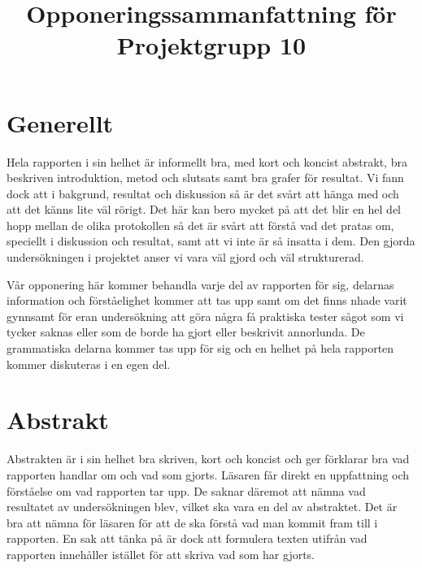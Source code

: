 \documentclass{article}
\begin{document}
\title{Opponeringssammanfattning för Projektgrupp 10}

\maketitle

\section{Generellt}
Hela rapporten i sin helhet är informellt bra, med kort och koncist abstrakt, bra beskriven introduktion, metod och slutsats samt bra grafer för resultat. Vi fann dock att i bakgrund, resultat och diskussion så är det svårt att hänga med och att det känns lite väl rörigt. Det här kan bero mycket på att det blir en hel del hopp mellan de olika protokollen så det är svårt att förstå vad det pratas om, speciellt i diskussion och resultat, samt att vi inte är så insatta i dem. Den gjorda undersökningen i projektet anser vi vara väl gjord och väl strukturerad.

Vår opponering här kommer behandla varje del av rapporten för sig, delarnas information och förståelighet kommer att tas upp samt om det finns nhade varit gynnsamt för eran undersökning att göra några få praktiska tester sågot som vi tycker saknas eller som de borde ha gjort eller beskrivit annorlunda. De grammatiska delarna kommer tas upp för sig och en helhet på hela rapporten kommer diskuteras i en egen del.

\section{Abstrakt}
Abstrakten är i sin helhet bra skriven, kort och koncist och ger förklarar bra vad rapporten handlar om och vad som gjorts. Läsaren får direkt en uppfattning och förståelse om vad rapporten tar upp. De saknar däremot att nämna vad resultatet av undersökningen blev, vilket ska vara en del av abstraktet. Det är bra att nämna för läsaren för att de ska förstå vad man kommit fram till i rapporten. En sak att tänka på är dock att formulera texten utifrån vad rapporten innehåller istället för att skriva vad som har gjorts.
\end{document}
